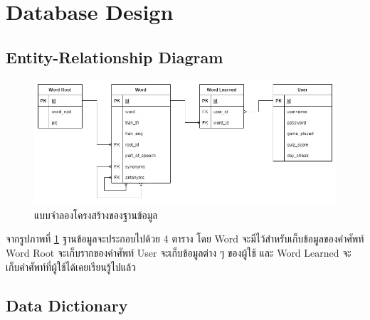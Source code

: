 \documentclass[12pt,oneside,openright,a4paper]{cpe-thai-project}
\begin{document}
\pagebreak
\section{Database Design}
\subsection{Entity-Relationship Diagram} \label{ssec:DB}
\begin{figure}[!h]\centering
	\includegraphics[width=\textwidth, keepaspectratio=true]{image/chap3/ER diagrams.jpg}
	\caption{แบบจำลองโครงสร้างของฐานข้อมูล}\label{fig:ERDiagram}
\end{figure}
\hspace{1cm}
จากรูปภาพที่ \ref{fig:ERDiagram} ฐานข้อมูลจะประกอบไปด้วย 4 ตาราง โดย Word จะมีไว้สำหรับเก็บข้อมูลของคำศัพท์ Word Root
จะเก็บรากของคำศัพท์ User จะเก็บข้อมูลต่าง ๆ ของผู้ใช้ และ Word Learned จะเก็บคำศัพท์ที่ผู้ใช้ได้เคยเรียนรู้ไปแล้ว

\pagebreak
\subsection{Data Dictionary}
\end{document}
